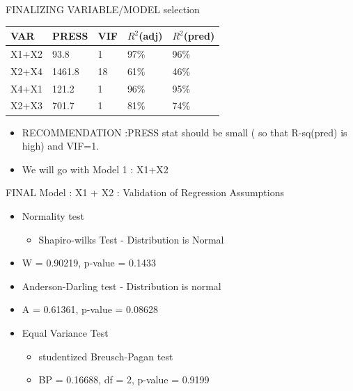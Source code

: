 \documentclass[
  ignorenonframetext,
]{beamer}
\providecommand{\tightlist}{%
  \setlength{\itemsep}{0pt}\setlength{\parskip}{0pt}}
\begin{document}
\begin{frame}{FINALIZING VARIABLE/MODEL selection}
\protect\hypertarget{finalizing-variablemodel-selection}{}
\begin{longtable}[]{@{}lllll@{}}
\toprule
VAR & PRESS & VIF & \(R^{2}\)(adj) & \(R^{2}\)(pred) \\
\midrule
\endhead
X1+X2 & 93.8 & 1 & 97\% & 96\% \\
X2+X4 & 1461.8 & 18 & 61\% & 46\% \\
X4+X1 & 121.2 & 1 & 96\% & 95\% \\
X2+X3 & 701.7 & 1 & 81\% & 74\% \\
\bottomrule
\end{longtable}

\begin{itemize}
\tightlist
\item
  RECOMMENDATION :PRESS stat should be small ( so that R-sq(pred) is
  high) and VIF=1.
\item
  We will go with Model 1 : X1+X2
\end{itemize}
\end{frame}

\begin{frame}{FINAL Model : X1 + X2 : Validation of Regression
Assumptions}
\protect\hypertarget{final-model-x1-x2-validation-of-regression-assumptions}{}
\begin{itemize}
\item
  Normality test

  \begin{itemize}
  \tightlist
  \item
    Shapiro-wilks Test - Distribution is Normal
  \end{itemize}
\item
  W = 0.90219, p-value = 0.1433
\item
  Anderson-Darling test - Distribution is normal
\item
  A = 0.61361, p-value = 0.08628
\item
  Equal Variance Test

  \begin{itemize}
  \tightlist
  \item
    studentized Breusch-Pagan test
  \item
    BP = 0.16688, df = 2, p-value = 0.9199
  \end{itemize}
\end{itemize}
\end{frame}
\end{document}
